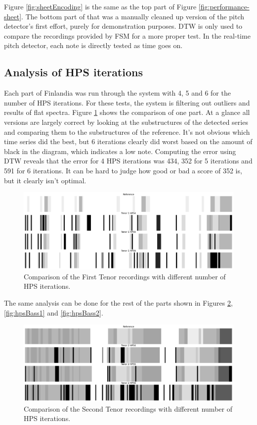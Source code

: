 Figure \ref{fig:sheetEncoding} is the same as the top part of Figure \ref{fig:performance-sheet}. The bottom part of that was a manually cleaned up version of the pitch detector's first effort, purely for demonstration purposes. DTW is only used to compare the recordings provided by FSM for a more proper test. In the real-time pitch detector, each note is directly tested as time goes on.

\subsection{Analysis of HPS iterations}
Each part of Finlandia was run through the system with 4, 5 and 6 for the number of HPS iterations. For these tests, the system is filtering out outliers and results of flat spectra. Figure \ref{fig:hpsTenor1} shows the comparison of one part. At a glance all versions are largely correct by looking at the substructures of the detected series and comparing them to the substructures of the reference. It's not obvious which time series did the best, but 6 iterations clearly did worst based on the amount of black in the diagram, which indicates a low note. Computing the error using DTW reveals that the error for 4 HPS iterations was 434, 352 for 5 iterations and 591 for 6 iterations. It can be hard to judge how good or bad a score of 352 is, but it clearly isn't optimal.

\begin{figure}[ht]
    \centering
    \includegraphics[width=\textwidth]{./images/hpsTenor1.png}
    \caption{Comparison of the First Tenor recordings with different number of HPS iterations. \label{fig:hpsTenor1}}
\end{figure}

The same analysis can be done for the rest of the parts shown in Figures \ref{fig:hpsTenor2}, \ref{fig:hpsBass1} and \ref{fig:hpsBass2}.

\begin{figure}[ht]
    \centering
    \includegraphics[width=\textwidth]{./images/hpsTenor2.png}
    \caption{Comparison of the Second Tenor recordings with different number of HPS iterations. \label{fig:hpsTenor2}}
\end{figure}


